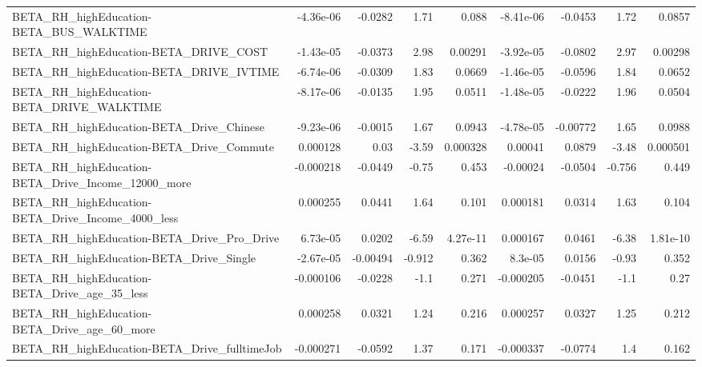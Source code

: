 \begin{tabular}{lrrrrrrrr}
BETA\_RH\_highEducation-BETA\_BUS\_WALKTIME            &   -4.36e-06 &      -0.0282 &      1.71 &    0.088 &  -8.41e-06 &     -0.0453 &         1.72 &        0.0857 \\
BETA\_RH\_highEducation-BETA\_DRIVE\_COST              &   -1.43e-05 &      -0.0373 &      2.98 &  0.00291 &  -3.92e-05 &     -0.0802 &         2.97 &       0.00298 \\
BETA\_RH\_highEducation-BETA\_DRIVE\_IVTIME            &   -6.74e-06 &      -0.0309 &      1.83 &   0.0669 &  -1.46e-05 &     -0.0596 &         1.84 &        0.0652 \\
BETA\_RH\_highEducation-BETA\_DRIVE\_WALKTIME          &   -8.17e-06 &      -0.0135 &      1.95 &   0.0511 &  -1.48e-05 &     -0.0222 &         1.96 &        0.0504 \\
BETA\_RH\_highEducation-BETA\_Drive\_Chinese           &   -9.23e-06 &      -0.0015 &      1.67 &   0.0943 &  -4.78e-05 &    -0.00772 &         1.65 &        0.0988 \\
BETA\_RH\_highEducation-BETA\_Drive\_Commute           &    0.000128 &         0.03 &     -3.59 & 0.000328 &    0.00041 &      0.0879 &        -3.48 &      0.000501 \\
BETA\_RH\_highEducation-BETA\_Drive\_Income\_12000\_more &   -0.000218 &      -0.0449 &     -0.75 &    0.453 &   -0.00024 &     -0.0504 &       -0.756 &         0.449 \\
BETA\_RH\_highEducation-BETA\_Drive\_Income\_4000\_less  &    0.000255 &       0.0441 &      1.64 &    0.101 &   0.000181 &      0.0314 &         1.63 &         0.104 \\
BETA\_RH\_highEducation-BETA\_Drive\_Pro\_Drive         &    6.73e-05 &       0.0202 &     -6.59 & 4.27e-11 &   0.000167 &      0.0461 &        -6.38 &      1.81e-10 \\
BETA\_RH\_highEducation-BETA\_Drive\_Single            &   -2.67e-05 &     -0.00494 &    -0.912 &    0.362 &    8.3e-05 &      0.0156 &        -0.93 &         0.352 \\
BETA\_RH\_highEducation-BETA\_Drive\_age\_35\_less       &   -0.000106 &      -0.0228 &      -1.1 &    0.271 &  -0.000205 &     -0.0451 &         -1.1 &          0.27 \\
BETA\_RH\_highEducation-BETA\_Drive\_age\_60\_more       &    0.000258 &       0.0321 &      1.24 &    0.216 &   0.000257 &      0.0327 &         1.25 &         0.212 \\
BETA\_RH\_highEducation-BETA\_Drive\_fulltimeJob       &   -0.000271 &      -0.0592 &      1.37 &    0.171 &  -0.000337 &     -0.0774 &          1.4 &         0.162 \\

\end{tabular}
